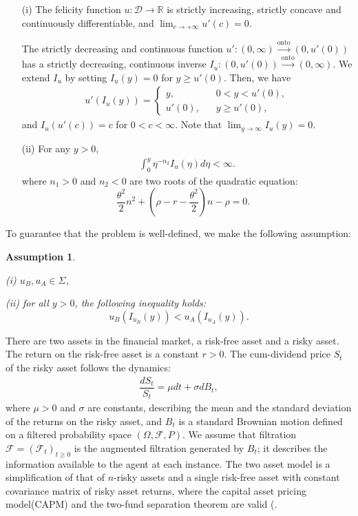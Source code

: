 \documentclass[a4paper,report, 11pt]{article}
\newtheorem{as}{Assumption}
\def\s{\sigma}
\def\t{\theta}
\def\be{\begin{eqnarray}}
\def\ee{\end{eqnarray}}
\begin{document}
\begin{itemize}
	\item[(i)] The felicity function $u:{\mathcal D}\to \mathbb{R}$ is strictly increasing, strictly concave and continuously differentiable, and $\lim_{c\to +\infty}u'(c) = 0$. \vspace{2mm}
	
	The strictly decreasing and continuous function $u':(0,\infty) \overset{\textrm{onto}}{\longrightarrow} (0,u'(0))$ has a strictly decreasing, continuous inverse $I_u:(0,u'(0))\overset{\textrm{onto}}{\longrightarrow}(0,\infty)$. We extend $I_u$ by setting $I_u(y)=0$ for $y\ge u'(0)$. Then, we have 
	\begin{align}\label{eq:inverse-extend}
	u'(I_u(y))=\begin{cases}
	y,\;\;\;&0<y<u'(0),\\
	u'(0),\;\;\;&y\ge u'(0),
	\end{cases}
	\end{align}
	and $I_u(u'(c))=c$ for $0<c<\infty$. Note that $\lim_{y\to \infty}I_u(y) = 0$.
	\item[(ii)] 	For any $y>0$, 
	\begin{align}\label{as:well-defined}
	\int_0^y \eta^{-n_2}I_u(\eta)d\eta < \infty.
	\end{align}
	where	$n_1>0$ and $n_2<0$ are two roots of the quadratic equation:
	\begin{equation}\label{eq:quadratic}
	\dfrac{\t^2}{2}n^2 + \left(\rho-r-\frac{\t^2}{2}\right)n-\rho=0.\;\;\;%
	\end{equation}
\end{itemize}

To guarantee that the problem is well-defined, we make the following assumption:
\begin{as}\label{as:utility}
	\item[(i)] $u_B,u_A \in \Sigma$, 
	\item[(ii)] for all $y>0$, the following inequality holds:
	\begin{equation*}
	u_B(I_{u_B}(y))<u_A(I_{u_A}(y)).
	\end{equation*}

\end{as}

There are two assets in the financial market, a risk-free asset and a risky asset. The return on the risk-free asset is a constant $r>0$. The cum-dividend price $S_t$ of the risky asset follows the dynamics:
\be\label{eq:dynamics_risky}
\dfrac{dS_t}{S_t} = \mu dt+ \s dB_t,
\ee
where $\mu>0$ and $\sigma$ are constants, describing the mean and the standard deviation of the returns on the risky asset, and $B_t$ is a standard Brownian motion defined on a filtered probability space $(\Omega,{\mathcal F}, P)$.  We assume that  filtration ${\mathcal F}=({\mathcal F}_t)_{t\geq 0}$ is the augmented filtration generated by $B_t$; it describes the information available to the agent at each instance. The two asset model is a simplification of that of  $n$-risky assets and a single risk-free asset with constant covariance matrix of risky asset returns, where the capital asset pricing model(CAPM) and the two-fund separation theorem are valid (\citet{GL}.
\end{document}

